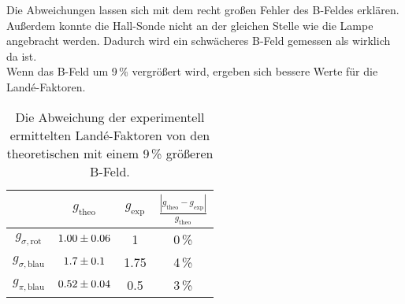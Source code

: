 Die Abweichungen lassen sich mit dem recht großen Fehler des B-Feldes erklären. Außerdem konnte die Hall-Sonde nicht an der gleichen Stelle wie die Lampe angebracht werden. Dadurch wird ein schwächeres B-Feld gemessen als wirklich da ist. \\
Wenn das B-Feld um 9\,\% vergrößert wird, ergeben sich bessere Werte für die Landé-Faktoren.

\begin{table}[H]
   \centering
   \caption{Die Abweichung der experimentell ermittelten Landé-Faktoren von den theoretischen mit einem 9\,\% größeren B-Feld.}
   \label{tab:}
   \begin{tabular}{c|c|c|c}
     & $g_\text{theo}$ & $g_\text{exp}$ & $\frac{|g_\text{theo} - g_\text{exp}|}{g_\text{theo}}$ \\
     \hline
     $g_{\sigma,\text{rot}}$  & $\num{1.00 +- 0.06}$ & 1 & 0\,\% \\
     $g_{\sigma,\text{blau}}$ & $\num{1.7 +- 0.1}$   & 1.75 & 4\,\% \\
     $g_{\pi,\text{blau}}$    & $\num{0.52 +- 0.04}$ & 0.5 & 3\,\% \\
   \end{tabular}
\end{table}
